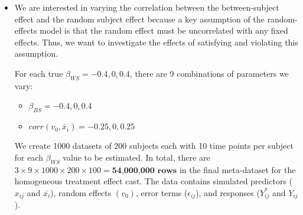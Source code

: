 \documentclass{article}
\begin{document}
\begin{itemize}
\begin{itemize}
                
            \end{itemize}
            \item We are interested in varying the correlation between the between-subject effect and the random subject effect because a key assumption of the random-effects model is that the random effect must be uncorrelated with any fixed effects. Thus, we want to investigate the effects of satisfying and violating this assumption. 
            
            For each true $\beta_{WS} = -0.4, 0, 0.4$, there are 9 combinations of parameters we vary: 
            \begin{itemize}
                \item $\beta_{BS} = -0.4, 0, 0.4$
                \item $corr(v_0,\bar{x}_i) = -0.25, 0, 0.25$
            \end{itemize} 
            
            We create 1000 datasets of 200 subjects each with 10 time points per subject for each $\beta_{WS}$ value to be estimated. In total, there are $3 \times 9 \times 1000 \times 200 \times 100 = \textbf{54,000,000 rows}$  in the final meta-dataset for the homogeneous treatment effect cast. The data contains simulated predictors ($x_{ij}$ and $\bar{x_i}$), random effects $(v_0)$, error terms ($\epsilon_{ij}$), and responses ($Y_{ij}^*$ and $Y_{ij}$).
        \end{itemize}
\end{document}
